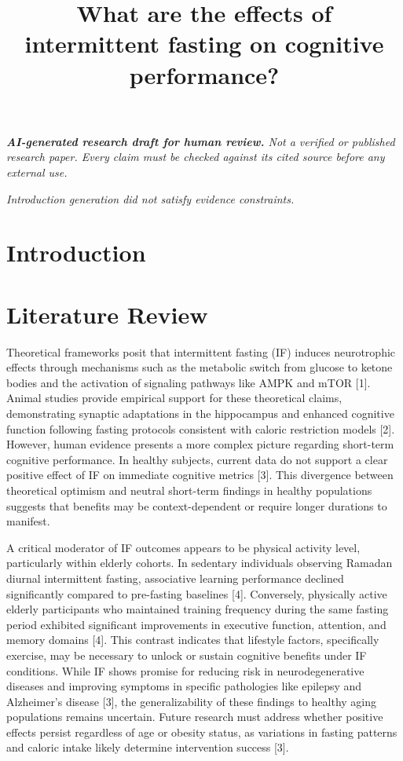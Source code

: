 \documentclass[11pt]{article}
\title{What are the effects of intermittent fasting on cognitive performance?}
\date{}
\begin{document}
\maketitle
\textit{\textbf{AI-generated research draft for human review.} Not a verified or published research paper. Every claim must be checked against its cited source before any external use.}\par

\textit{Introduction generation did not satisfy evidence constraints.}

\section{Introduction}
\section{Literature Review}
Theoretical frameworks posit that intermittent fasting (IF) induces neurotrophic effects through mechanisms such as the metabolic switch from glucose to ketone bodies and the activation of signaling pathways like AMPK and mTOR [1]. Animal studies provide empirical support for these theoretical claims, demonstrating synaptic adaptations in the hippocampus and enhanced cognitive function following fasting protocols consistent with caloric restriction models [2]. However, human evidence presents a more complex picture regarding short-term cognitive performance. In healthy subjects, current data do not support a clear positive effect of IF on immediate cognitive metrics [3]. This divergence between theoretical optimism and neutral short-term findings in healthy populations suggests that benefits may be context-dependent or require longer durations to manifest.

A critical moderator of IF outcomes appears to be physical activity level, particularly within elderly cohorts. In sedentary individuals observing Ramadan diurnal intermittent fasting, associative learning performance declined significantly compared to pre-fasting baselines [4]. Conversely, physically active elderly participants who maintained training frequency during the same fasting period exhibited significant improvements in executive function, attention, and memory domains [4]. This contrast indicates that lifestyle factors, specifically exercise, may be necessary to unlock or sustain cognitive benefits under IF conditions. While IF shows promise for reducing risk in neurodegenerative diseases and improving symptoms in specific pathologies like epilepsy and Alzheimer's disease [3], the generalizability of these findings to healthy aging populations remains uncertain. Future research must address whether positive effects persist regardless of age or obesity status, as variations in fasting patterns and caloric intake likely determine intervention success [3].
\end{document}
